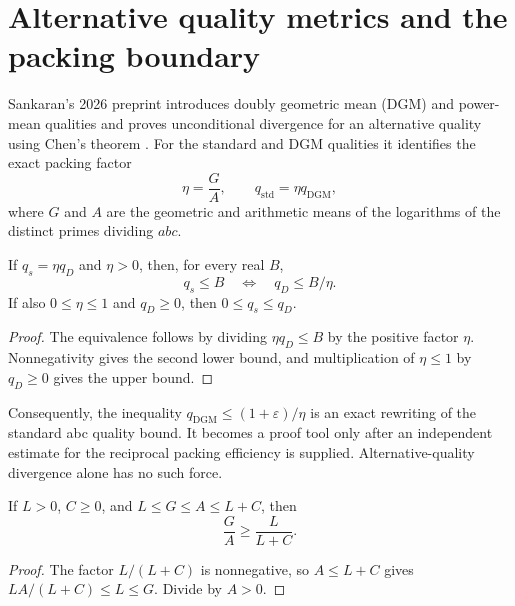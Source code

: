 \section{Alternative quality metrics and the packing boundary}
\label{sec:alternative-quality-packing}

Sankaran's 2026 preprint introduces doubly geometric mean (DGM) and
power-mean qualities and proves unconditional divergence for an alternative
quality using Chen's theorem \cite{Sankaran2026AlternativeQuality}.  For the
standard and DGM qualities it identifies the exact packing factor
\[
 \eta=\frac GA,
 \qquad q_{\mathrm{std}}=\eta q_{\mathrm{DGM}},     \tag{AQ.1}
\]
where $G$ and $A$ are the geometric and arithmetic means of the logarithms
of the distinct primes dividing $abc$.

\begin{proposition}
\label{prop:alternative-quality-packing-transfer}
If $q_s=\eta q_D$ and $\eta>0$, then, for every real $B$,
\[
 q_s\le B\quad\Longleftrightarrow\quad q_D\le B/\eta.
\]
If also $0\le\eta\le1$ and $q_D\ge0$, then
$0\le q_s\le q_D$.
\end{proposition}

\begin{proof}
The equivalence follows by dividing $\eta q_D\le B$ by the positive factor
$\eta$.  Nonnegativity gives the second lower bound, and multiplication of
$\eta\le1$ by $q_D\ge0$ gives the upper bound.
\end{proof}

Consequently, the inequality
$q_{\mathrm{DGM}}\le(1+\varepsilon)/\eta$ is an exact rewriting of the
standard abc quality bound.  It becomes a proof tool only after an
independent estimate for the reciprocal packing efficiency is supplied.
Alternative-quality divergence alone has no such force.

\begin{proposition}
\label{prop:alternative-quality-clustered-logs}
If $L>0$, $C\ge0$, and $L\le G\le A\le L+C$, then
\[
 \frac GA\ge\frac{L}{L+C}.
\]
\end{proposition}

\begin{proof}
The factor $L/(L+C)$ is nonnegative, so $A\le L+C$ gives
$LA/(L+C)\le L\le G$.  Divide by $A>0$.
\end{proof}

